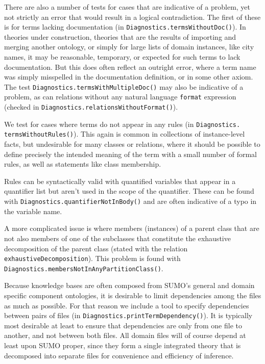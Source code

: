 \documentclass{book}
\begin{document}
\begin{sloppypar}
There are also a number of tests for cases that are indicative of a problem, yet
not strictly an error that would result in a logical contradiction.  The first
of these is for terms lacking documentation (in
\texttt{Diagnostics.termsWithoutDoc()}).  In theories under construction,
theories that are the results of importing and merging another ontology, or
simply for large lists of domain instances, like city names, it may be
reasonable, temporary, or expected for such terms to lack documentation.  But
this does often reflect an outright error, where a term name was simply
misspelled in the documentation definition, or in some other axiom.  The test
\texttt{Diagnostics.termsWithMultipleDoc()} may also be indicative of a problem, as
can relations without any natural language \texttt{format} expression (checked in
\texttt{Diagnostics.relationsWithoutFormat()}).
\end{sloppypar}

We test for cases where terms do not appear in any rules (in
\texttt{Diagnostics. termsWithoutRules()}).  This again is common in collections
of instance-level facts, but undesirable for many classes or relations, where it
should be possible to define precisely the intended meaning of the term with a
small number of formal rules, as well as statements like class membership.

Rules can be syntactically valid with quantified variables that appear in a quantifier
list but aren't used in the scope of the quantifier.  These can be found
with \texttt{Diagnostics.quantifierNotInBody()} and are often indicative of
a typo in the variable name.

\begin{sloppypar}
A more complicated issue is where members (instances) of a parent class that are
not also members of one of the subclasses that constitute the exhaustive
decomposition of the parent class (stated with the relation
\texttt{exhaustiveDecomposition}).  This problem is found with
\texttt{Diagnostics.membersNotInAnyPartitionClass()}.
\end{sloppypar}

Because knowledge bases are often composed from SUMO's general and domain
specific component ontologies, it is desirable to limit dependencies among the
files as much as possible.  For that reason we include a tool to specify
dependencies between pairs of files (in
\texttt{Diagnostics.printTermDependency()}).  It is typically most desirable at least to
ensure that dependencies are only from one file to another, and not between both
files.  All domain files will of course depend at least upon SUMO proper, since
they form a single integrated theory that is decomposed into separate files for
convenience and efficiency of inference.
\end{document}

